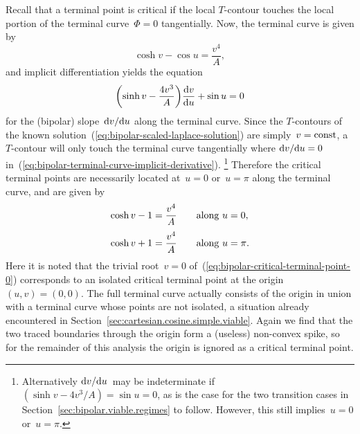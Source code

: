 Recall that a terminal point is critical
if the local $T$-contour touches
the local portion of the terminal curve~$\Phi = 0$ tangentially.
Now, the terminal curve is given by
\begin{equation}
  \cosh v - \cos u = \frac{v^4}{A},
  \label{eq:bipolar-terminal-curve}
\end{equation}
and implicit differentiation yields the equation
\begin{equation}
  \roundbr*{\sinh v - \frac{4 v^3}{A}} \tder{v}{u} + \sin u = 0
  \label{eq:bipolar-terminal-curve-implicit-derivative}
\end{equation}
for the (bipolar) slope~$\mathop{}\!\mathrm{d} v / {\mathop{}\!\mathrm{d} u}$
along the terminal curve.
Since the $T$-contours
of the known solution~(\ref{eq:bipolar-scaled-laplace-solution})
are simply~$v = \mathrm{const}$,
a $T$-contour will only touch the terminal curve tangentially
where $\mathop{}\!\mathrm{d} v / {\mathop{}\!\mathrm{d} u} = 0$
in~(\ref{eq:bipolar-terminal-curve-implicit-derivative}).%
\footnote{
  Alternatively $\mathop{}\!\mathrm{d} v / {\mathop{}\!\mathrm{d} u}$~may be indeterminate
  if~$(\sinh v - 4 v^3 / A) = \sin u = 0$,
  as is the case for the two transition cases
  in Section~\ref{sec:bipolar.viable.regimes} to follow.
  However, this still implies~$u = 0$ or~$u = \pi$.
}
Therefore the critical terminal points are necessarily located
at~$u = 0$ or~$u = \pi$ along the terminal curve,
and are given by
\begin{align}
  \cosh v - 1 &= \frac{v^4}{A} \eqnspace \text{along~$u = 0$},
  \label{eq:bipolar-critical-terminal-point-0}
    \\[\tallspace]
  \cosh v + 1 &= \frac{v^4}{A} \eqnspace \text{along~$u = \pi$}.
  \label{eq:bipolar-critical-terminal-point-pi}
\end{align}
Here it is noted that the trivial root~$v = 0$
of~(\ref{eq:bipolar-critical-terminal-point-0})
corresponds to an isolated critical terminal point
at the origin~$(u, v) = (0, 0)$.
The full terminal curve actually consists of the origin
in union with a  terminal curve
whose points are not isolated,
a situation already encountered
in Section~\ref{sec:cartesian.cosine.simple.viable}.
Again we find that the two traced boundaries through the origin
form a (useless) non-convex spike,
so for the remainder of this analysis
the origin is ignored as a critical terminal point.

